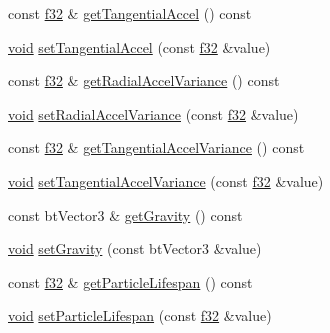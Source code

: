 \begin{DoxyCompactItemize}
\item 
const \mbox{\hyperlink{_util_8h_a5f6906312a689f27d70e9d086649d3fd}{f32}} \& \mbox{\hyperlink{classnjli_1_1_particle_emitter_ab03a9c460bed389cd99131a0700db5af}{get\+Tangential\+Accel}} () const
\item 
\mbox{\hyperlink{_thread_8h_af1e856da2e658414cb2456cb6f7ebc66}{void}} \mbox{\hyperlink{classnjli_1_1_particle_emitter_a0a95851c167af70c9b696d4e2ff34df2}{set\+Tangential\+Accel}} (const \mbox{\hyperlink{_util_8h_a5f6906312a689f27d70e9d086649d3fd}{f32}} \&value)
\item 
const \mbox{\hyperlink{_util_8h_a5f6906312a689f27d70e9d086649d3fd}{f32}} \& \mbox{\hyperlink{classnjli_1_1_particle_emitter_a6265d5e2fced029bb49323238dbbfd80}{get\+Radial\+Accel\+Variance}} () const
\item 
\mbox{\hyperlink{_thread_8h_af1e856da2e658414cb2456cb6f7ebc66}{void}} \mbox{\hyperlink{classnjli_1_1_particle_emitter_a36a8d257bb331e40001575edda7a1564}{set\+Radial\+Accel\+Variance}} (const \mbox{\hyperlink{_util_8h_a5f6906312a689f27d70e9d086649d3fd}{f32}} \&value)
\item 
const \mbox{\hyperlink{_util_8h_a5f6906312a689f27d70e9d086649d3fd}{f32}} \& \mbox{\hyperlink{classnjli_1_1_particle_emitter_a5f194996243198be315773fd478acc32}{get\+Tangential\+Accel\+Variance}} () const
\item 
\mbox{\hyperlink{_thread_8h_af1e856da2e658414cb2456cb6f7ebc66}{void}} \mbox{\hyperlink{classnjli_1_1_particle_emitter_a350b5d3c77cacf23fa7297414d215d0e}{set\+Tangential\+Accel\+Variance}} (const \mbox{\hyperlink{_util_8h_a5f6906312a689f27d70e9d086649d3fd}{f32}} \&value)
\item 
const bt\+Vector3 \& \mbox{\hyperlink{classnjli_1_1_particle_emitter_a35f6b8d1fd24e55ad727a647a711b6d4}{get\+Gravity}} () const
\item 
\mbox{\hyperlink{_thread_8h_af1e856da2e658414cb2456cb6f7ebc66}{void}} \mbox{\hyperlink{classnjli_1_1_particle_emitter_a88b3e1c1cac582fc31076c1a13663db8}{set\+Gravity}} (const bt\+Vector3 \&value)
\item 
const \mbox{\hyperlink{_util_8h_a5f6906312a689f27d70e9d086649d3fd}{f32}} \& \mbox{\hyperlink{classnjli_1_1_particle_emitter_a6218eed2c61aa532844d1dda807a8c21}{get\+Particle\+Lifespan}} () const
\item 
\mbox{\hyperlink{_thread_8h_af1e856da2e658414cb2456cb6f7ebc66}{void}} \mbox{\hyperlink{classnjli_1_1_particle_emitter_ae66b02e5fb5fa80f2e314a6013e7059d}{set\+Particle\+Lifespan}} (const \mbox{\hyperlink{_util_8h_a5f6906312a689f27d70e9d086649d3fd}{f32}} \&value)

\end{DoxyCompactItemize}
